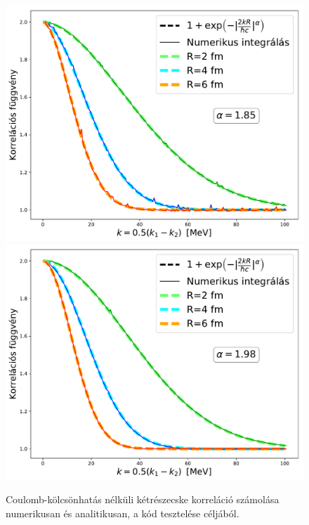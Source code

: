 \documentclass[11pt,a4paper]{article}
\numberwithin{equation}{subsection}
\numberwithin{figure}{section}
\begin{document}
\begin{figure}[H]
\centering
\includegraphics[scale=0.36]{pic/Coulomb/C2_noCoulomb_R246_a185.pdf}
\includegraphics[scale=0.36]{pic/Coulomb/C2_noCoulomb_R246_a198.pdf}
\caption{Coulomb-kölcsönhatás nélküli kétrészecske korreláció számolása numerikusan és analitikusan, a kód tesztelése céljából.}
\label{fig:CRT}
\end{figure}
\end{document}

